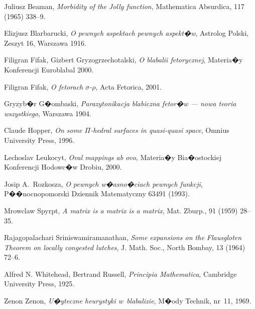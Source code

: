 \documentclass[licencjacka]{pracamgr}
\begin{document}
\begin{thebibliography}{99}

 Juliusz Beaman, \textit{Morbidity of the Jolly
    function}, Mathematica Absurdica, 117 (1965) 338--9.

 Elizjusz Blarbarucki, \textit{O pewnych
    aspektach pewnych aspekt�w}, Astrolog Polski, Zeszyt 16, Warszawa
  1916.

 Filigran Fifak, Gizbert Gryzogrzechotalski,
  \textit{O blabalii fetorycznej}, Materia�y Konferencji Euroblabal
  2000.

 Filigran Fifak, \textit{O fetorach
    $\sigma$-$\rho$}, Acta Fetorica, 2001.

 Gryzyb�r G�ombaski, \textit{Parazytonikacja
    blabiczna fetor�w --- nowa teoria wszystkiego}, Warszawa 1904.

 Claude Hopper, \textit{On some $\Pi$-hedral
    surfaces in quasi-quasi space}, Omnius University Press, 1996.

 Lechoslav Leukocyt, \textit{Oval mappings ab ovo},
  Materia�y Bia�ostockiej Konferencji Hodowc�w Drobiu, 2000.

 Josip A.~Rozkosza, \textit{O pewnych w�asno�ciach
    pewnych funkcji}, P��nocnopomorski Dziennik Matematyczny 63491
  (1993).

 Mrowclaw Spyrpt, \textit{A matrix is a matrix
    is a matrix}, Mat. Zburp., 91 (1959) 28--35.

 Rajagopalachari Sriniswamiramanathan,
  \textit{Some expansions on the Flausgloten Theorem on locally
    congested lutches}, J. Math.  Soc., North Bombay, 13 (1964) 72--6.

 Alfred N. Whitehead, Bertrand Russell,
  \textit{Principia Mathematica}, Cambridge University Press, 1925.

 Zenon Zenon, \textit{U�yteczne heurystyki
    w~blabalizie}, M�ody Technik, nr~11, 1969.

\end{thebibliography}
\end{document}
